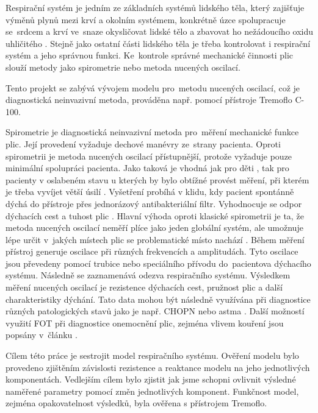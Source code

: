 Respirační systém je jedním ze základních systémů lidského těla, který zajišťuje výměnů plynů mezi krví a okolním systémem, konkrétně úzce spolupracuje se~srdcem a krví ve~snaze okysličovat lidské tělo a zbavovat ho nežádoucího oxidu uhličitého \cite{muni}. Stejně jako ostatní části lidského těla je třeba kontrolovat i respirační systém a jeho správnou funkci. Ke~kontrole správné mechanické činnosti plic slouží metody jako spirometrie nebo metoda nucených oscilací. 

Tento projekt se zabývá vývojem modelu pro~metodu nucených oscilací, což je diagnostická neinvazivní metoda, prováděna např. pomocí přístroje Tremoflo C-100.  


Spirometrie je diagnostická neinvazivní metoda pro~měření mechanické funkce plic. Její provedení vyžaduje dechové manévry ze~strany pacienta. Oproti spirometrii je metoda nucených oscilací přístupnější, protože vyžaduje pouze minimální spolupráci pacienta. Jako taková je vhodná jak pro děti \cite{StarczewskaDymek2019}, tak pro pacienty v oslabeném stavu u kterých by bylo obtížné provést měření, při kterém je třeba vyvíjet větší úsilí \cite{Vlcek2018}. Vyšetření probíhá v klidu, kdy pacient spontánně dýchá do přístroje přes jednorázový antibakteriální filtr. Vyhodnocuje se odpor dýchacích cest a tuhost plic \cite{Vlcek2018}.
Hlavní výhoda oproti klasické spirometrii je ta, že metoda nucených oscilací neměří plíce jako jeden globální systém, ale umožnuje lépe určit v~jakých místech plic se problematické místo nachází \cite{Bhattarai27August2020}.
Během měření přístroj generuje oscilace při různých frekvencích a amplitudách. Tyto oscilace jsou převedeny pomocí trubice nebo speciálního přívodu do~pacientova dýchacího systému. Následně se zaznamenává odezva respiračního systému. Výsledkem měření nucených oscilací je rezistence dýchacích cest, pružnost plic a další charakteristiky dýchání. Tato data mohou být následně využívána při diagnostice různých patologických stavů jako je např. CHOPN nebo astma \cite{Vlcek2018}.
Další možností využití FOT při diagnostice onemocnění plic, zejména vlivem kouření jsou popsány v~článku \cite{OliveiraRibeiro2018}.


Cílem této práce je sestrojit model respiračního systému. Ověření modelu bylo provedeno zjištěním závislosti rezistence a reaktance modelu na jeho jednotlivých komponentách.
Vedlejším cílem bylo zjistit jak jsme schopni ovlivnit výsledné naměřené parametry pomocí změn jednotlivých komponent. Funkčnost model, zejména opakovatelnost výsledků, byla ověřena s přístrojem Tremoflo.


